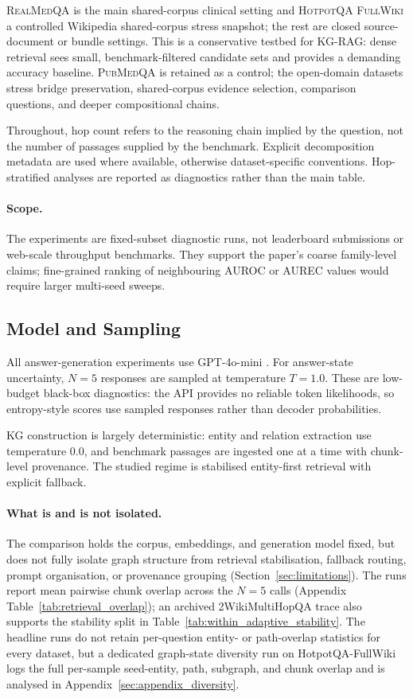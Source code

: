 \textsc{RealMedQA} is the main shared-corpus clinical setting and
\textsc{HotpotQA FullWiki} a controlled Wikipedia shared-corpus stress
snapshot; the rest are closed source-document or bundle settings.
This is a conservative testbed for KG-RAG: dense retrieval sees small,
benchmark-filtered candidate sets and provides a demanding accuracy baseline.
\textsc{PubMedQA} is retained as a control; the open-domain datasets
stress bridge preservation, shared-corpus evidence selection, comparison
questions, and deeper compositional chains.

Throughout, hop count refers to the reasoning chain implied by the
question, not the number of passages supplied by the benchmark.
Explicit decomposition metadata are used where available, otherwise
dataset-specific conventions.
Hop-stratified analyses are reported as diagnostics rather than the main
table.

\paragraph{Scope.}
The experiments are fixed-subset diagnostic runs, not leaderboard submissions
or web-scale throughput benchmarks.
They support the paper's coarse family-level claims; fine-grained ranking of
neighbouring AUROC or AUREC values would require larger multi-seed sweeps.

\subsection{Model and Sampling}

All answer-generation experiments use GPT-4o-mini
\citep{openai2024gpt4omini}.
For answer-state uncertainty, $N=5$ responses are sampled at temperature
$T=1.0$.
These are low-budget black-box diagnostics: the API provides no reliable token
likelihoods, so entropy-style scores use sampled responses rather than decoder
probabilities.

KG construction is largely deterministic: entity and relation extraction use
temperature $0.0$, and benchmark passages are ingested one at a time with
chunk-level provenance.
The studied regime is stabilised entity-first retrieval with explicit fallback.

\paragraph{What is and is not isolated.}
The comparison holds the corpus, embeddings, and generation model fixed, but
does not fully isolate graph structure from retrieval stabilisation, fallback
routing, prompt organisation, or provenance grouping
(Section~\ref{sec:limitations}).
The runs report mean pairwise chunk overlap across the $N=5$ calls
(Appendix Table~\ref{tab:retrieval_overlap}); an archived 2WikiMultiHopQA
trace also supports the stability split in
Table~\ref{tab:within_adaptive_stability}.
The headline runs do not retain per-question entity- or path-overlap statistics
for every dataset, but a dedicated graph-state diversity run on HotpotQA-FullWiki
logs the full per-sample seed-entity, path, subgraph, and chunk overlap and is
analysed in Appendix~\ref{sec:appendix_diversity}.

